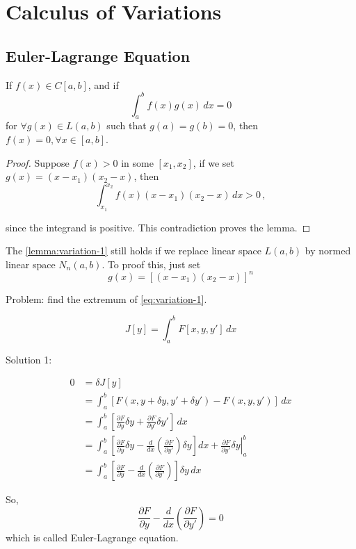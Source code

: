 \chapter{Calculus of Variations}

\section{Euler-Lagrange Equation}

\begin{lemma}
\label{lemma:variation-1}
If $f(x) \in C[a,b]$, and if
\begin{equation*}
\int_a^b f(x) g(x) \,dx = 0
\end{equation*}
for $\forall g(x) \in L(a,b)$ such that $g(a) = g(b) = 0$, 
then $f(x) = 0, \forall x \in [a, b]$.
\end{lemma}

\begin{proof}
Suppose $f(x) > 0$ in some $[x_1, x_2]$, if we set $g(x) = (x - x_1)(x_2 - x)$, then
\begin{equation*}
\int_{x_1}^{x_2} f(x)(x - x_1)(x_2 - x)\,dx > 0 \,,
\end{equation*}

since the integrand is positive. This contradiction proves the lemma.
\end{proof}

\begin{remark}
The \autoref{lemma:variation-1} still holds if we replace linear space $L(a,b)$ 
by normed linear space $N_n(a,b)$. To proof this, just set
\begin{equation*}
    g(x) = \left[ (x - x_1)(x_2 - x) \right]^n
\end{equation*}
\end{remark}


Problem: find the extremum of \cref{eq:variation-1}.

\begin{equation}
    \label{eq:variation-1}
    J[y] = \int_{a}^{b} F[x, y, y']\, dx
\end{equation}


Solution 1:

\begin{equation*}
\begin{split}
0 & = \delta J[y] \\
  & = \int_a^b \left[F(x, y + \delta y, y' + \delta y') - F(x, y, y')\right] \, dx\\ 
  & = \int_a^b \left[\frac{\partial F}{\partial y} \delta y 
      + \frac{\partial F}{\partial y'} \delta y' \right]\,dx\\
  & = \int_a^b \left[ \frac{\partial F}{\partial y} \delta y
      - \frac{d}{dx} \left( \frac{\partial F}{\partial y'}\right) \delta y \right] dx 
      + \left.\frac{\partial F}{\partial y'} \delta y \right\vert_a^b \\
  & = \int_a^b \left[ \frac{\partial F}{\partial y}
      - \frac{d}{dx} \left( \frac{\partial F}{\partial y'}\right) \right]\delta y \,dx 
\end{split}
\end{equation*}

So, 
\begin{equation}
\label{Euler-Lagrange-equation}
\frac{\partial F}{\partial y} - \frac{d}{dx} \left( \frac{\partial F}{\partial y'}\right) = 0
\end{equation}
which is called Euler-Lagrange equation.